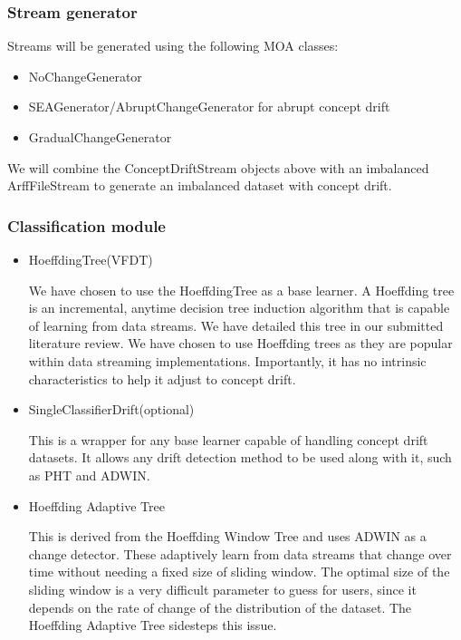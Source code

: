 \documentclass[11pt]{article}\usepackage[]{graphicx}\usepackage[]{color}
\begin{document}
\subsubsection{Stream generator}
Streams will be generated using the following MOA classes:
\begin{itemize}
\item NoChangeGenerator
\item SEAGenerator/AbruptChangeGenerator for abrupt concept drift
\item GradualChangeGenerator
\end{itemize}
We will combine the ConceptDriftStream objects above with an imbalanced ArffFileStream to generate an imbalanced dataset with concept drift.


\subsubsection{Classification module}

\begin{itemize}
\item HoeffdingTree(VFDT)

We have chosen to use the HoeffdingTree as a base learner. A Hoeffding tree is an incremental, anytime decision tree induction algorithm that is capable of learning from data streams. We have detailed this tree in our submitted literature review. We have chosen to use Hoeffding trees as they are popular within data streaming implementations. Importantly, it has no intrinsic characteristics to help it adjust to concept drift.

\item SingleClassifierDrift(optional) 

This is a wrapper for any base learner capable of handling concept drift datasets. It allows any drift detection method to be used along with it, such as PHT and ADWIN.

\item Hoeffding Adaptive Tree

This is derived from the Hoeffding Window Tree and uses ADWIN as a change detector. These adaptively learn from data streams that change over time without needing a fixed size of sliding window. The optimal size of the sliding window is a very difficult parameter to guess for users, since it depends on the rate of change of the distribution of the dataset. The Hoeffding Adaptive Tree sidesteps this issue.
\end{itemize}
				
\end{document}
